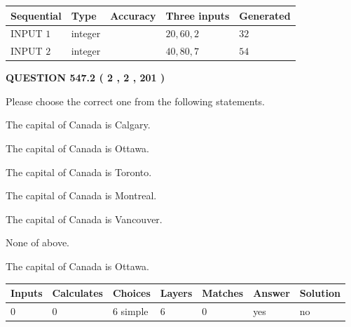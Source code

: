 \documentclass[12pt]{article}
\begin{document}
  
\noindent\begin{tabular}{|l|l|l|l|l|}
\hline
 Sequential & Type & Accuracy & Three inputs & Generated \\ 
\hline
 
 
  INPUT $  1 $ & integer &  & $
 20
 , 
 60
 , 
 2
 $ & $ 32 $ 
 \\  \hline  
 
 
  INPUT $  2 $ & integer &  & $
 40
 , 
 80
 , 
 7
 $ & $ 54 $ 
 \\  \hline  
 \end{tabular}
   
   
  
\vspace{0.2in}
  
{\textbf{\Large{QUESTION
547.2 
 ( 2 , 2 , 201 )
}}}
  
  
Please choose the correct one from the following statements.
 
 
The capital of Canada is Calgary.
 
 
The capital of Canada is Ottawa.
 
 
The capital of Canada is Toronto.
 
 
The capital of Canada is Montreal.
 
 
The capital of Canada is Vancouver.
 
 
 None of above.
 
 
\noindent{}
 
 
The capital of Canada is Ottawa.
 
 
\noindent{}
 
 
   
   
   
   
\noindent\begin{tabular}{|l|l|l|l|l|l|l|}
 \hline
Inputs & Calculates & Choices & Layers & Matches & Answer & Solution \\ \hline
 0  & 
 0  & 
 6
  simple  
  & 
 6  & 
 0  & 
  yes & 
  no 
  \\ \hline
 \end{tabular}
   
   
   
\end{document}
